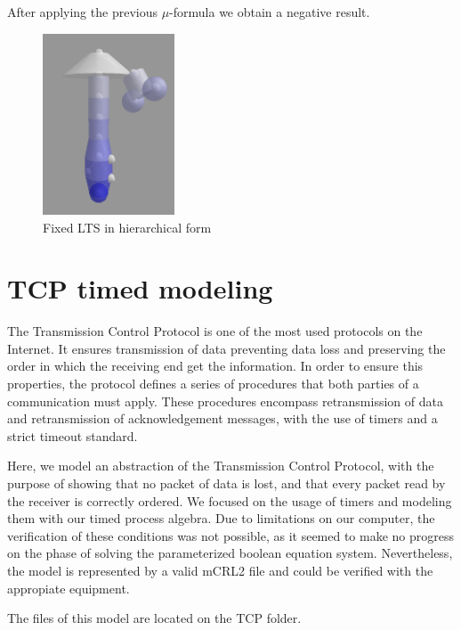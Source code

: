 \documentclass[11pt]{article}
\theoremstyle{definition}
\theoremstyle{plain}
\begin{document}
\begin{appendices}
After applying the previous $ \mu $-formula we obtain a negative result.
\begin{figure}[t!]
\centering
\includegraphics[width=0.35\textwidth, keepaspectratio]{img/Needham-Schroeder/fixed-state-LTSview.png}
\caption{Fixed LTS in hierarchical form}\label{ltsNSFixedView}
\end{figure}
\clearpage
\section{TCP timed modeling}

The Transmission Control Protocol is one of the most used protocols on the Internet. It ensures transmission of data preventing data loss and preserving the order in which the receiving end get the information. In order to ensure this properties, the protocol defines a series of procedures that both parties of a communication must apply. These procedures encompass retransmission of data and retransmission of acknowledgement messages, with the use of timers and a strict timeout standard.

Here, we model an abstraction of the Transmission Control Protocol, with the purpose of showing that no packet of data is lost, and that every packet read by the receiver is correctly ordered. We focused on the usage of timers and modeling them with our timed process algebra. Due to limitations on our computer, the verification of these conditions was not possible, as it seemed to make no progress on the phase of solving the parameterized boolean equation system. Nevertheless, the model is represented by a valid mCRL2 file and could be verified with the appropiate equipment.

The files of this model are located on the TCP folder.
\clearpage

\end{appendices}
\end{document}
